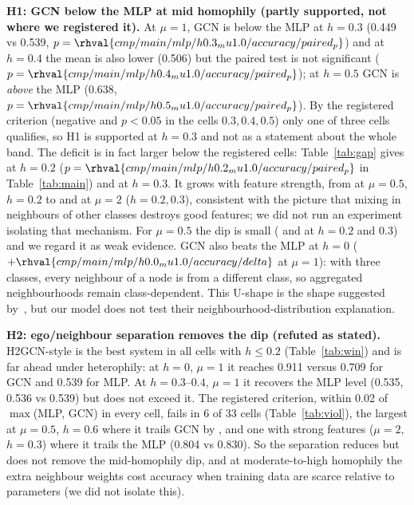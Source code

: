 \textbf{H1: GCN below the MLP at mid homophily (partly supported, not where we registered it).} At $\mu=1$, GCN is below the MLP at $h=0.3$ (0.449 vs 0.539, $p=\rhval{cmp/main/mlp/h0.3_mu1.0/accuracy/paired_p}$) and at $h=0.4$ the mean is also lower (0.506) but the paired test is not significant ($p=\rhval{cmp/main/mlp/h0.4_mu1.0/accuracy/paired_p}$); at $h=0.5$ GCN is \emph{above} the MLP (0.638, $p=\rhval{cmp/main/mlp/h0.5_mu1.0/accuracy/paired_p}$). By the registered criterion (negative and $p<0.05$ in the cells $0.3,0.4,0.5$) only one of three cells qualifies, so H1 is supported at $h=0.3$ and not as a statement about the whole band. The deficit is in fact larger below the registered cells: Table~\ref{tab:gap} gives  at $h=0.2$ ($p=\rhval{cmp/main/mlp/h0.2_mu1.0/accuracy/paired_p}$ in Table~\ref{tab:main}) and  at $h=0.3$. It grows with feature strength, from  at $\mu=0.5$, $h=0.2$ to  and  at $\mu=2$ ($h=0.2,0.3$), consistent with the picture that mixing in neighbours of other classes destroys good features; we did not run an experiment isolating that mechanism. For $\mu=0.5$ the dip is small ( and  at $h=0.2$ and $0.3$) and we regard it as weak evidence. GCN also beats the MLP at $h=0$ ($+\rhval{cmp/main/mlp/h0.0_mu1.0/accuracy/delta}$ at $\mu=1$): with three classes, every neighbour of a node is from a different class, so aggregated neighbourhoods remain class-dependent. This U-shape is the shape suggested by~\cite{ma2021is}, but our model does not test their neighbourhood-distribution explanation.

\textbf{H2: ego/neighbour separation removes the dip (refuted as stated).} H2GCN-style is the best system in all cells with $h\le0.2$ (Table~\ref{tab:win}) and is far ahead under heterophily: at $h=0$, $\mu=1$ it reaches 0.911 versus 0.709 for GCN and 0.539 for MLP. At $h=0.3$--$0.4$, $\mu=1$ it recovers the MLP level (0.535, 0.536 vs 0.539) but does not exceed it. The registered criterion, within 0.02 of $\max$(MLP, GCN) in every cell, fails in 6 of 33 cells (Table~\ref{tab:viol}), the largest at $\mu=0.5$, $h=0.6$ where it trails GCN by , and one with strong features ($\mu=2$, $h=0.3$) where it trails the MLP (0.804 vs 0.830). So the separation reduces but does not remove the mid-homophily dip, and at moderate-to-high homophily the extra neighbour weights cost accuracy when training data are scarce relative to parameters (we did not isolate this).

